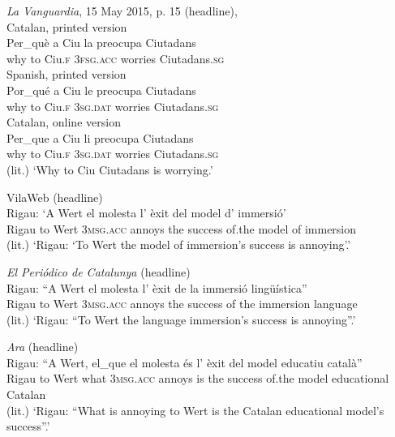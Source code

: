 \documentclass[output=paper,colorlinks,citecolor=brown,modfonts,nonflat]{langsci/langscibook}
\begin{document}
\ea%
 \emph{La} \emph{Vanguardia}, 15 May 2015, p. 15 (headline), 
 \label{ex:royo:5}\\
 \ea Catalan, printed version \label{ex:royo:5a}\\
 \gll Per\_què a Ciu la preocupa Ciutadans \\
why      to Ciu.\textsc{f} 3\textsc{fsg.acc} worries   Ciutadans.\textsc{sg} \\
 
 
 \ex Spanish, printed version \label{ex:royo:5b}\\
 \gll Por\_qué a Ciu le preocupa Ciutadans\\
why      to Ciu.\textsc{f} \textsc{3sg.dat} worries    Ciutadans.\textsc{sg}\\
 
 
\ex Catalan, online version \label{ex:royo:5c}\\
 \gll Per\_que a Ciu li preocupa Ciutadans \\
	why      to Ciu.\textsc{f} 3\textsc{sg.dat} worries    Ciutadans.\textsc{sg}\\
 \glt (lit.) ‘Why to Ciu Ciutadans is worrying.’
 
 \z
 \z


\ea%
 \label{ex:royo:6}
 \ea VilaWeb (headline)\\
 \gll Rigau: ‘A Wert el molesta l’ èxit del model d’ immersió’\\
Rigau   to Wert \textsc{3msg.acc} annoys   the success of.the model of immersion\\
 \glt (lit.) ‘Rigau: ‘To Wert the model of immersion’s success is annoying’.’
 
 \ex \textit{El Periódico de Catalunya} (headline)\\
 \gll Rigau: “A Wert el molesta l’ èxit de la immersió lingüística”\\
 Rigau   to Wert 3\textsc{msg.acc} annoys  the success of the immersion language\\
 \glt (lit.) ‘Rigau: “To Wert the language immersion’s success is annoying”.’
 
 \ex \textit{Ara} (headline)\\
 \gll Rigau: “A Wert, el\_que el molesta és l’ èxit del model educatiu català”\\
Rigau    to Wert what   \textsc{3msg.acc} annoys  is the success of.the model educational Catalan\\
 \glt (lit.) ‘Rigau: “What is annoying to Wert is the Catalan educational model’s success”.’ 
 \z
 \z
{}
\end{document}
